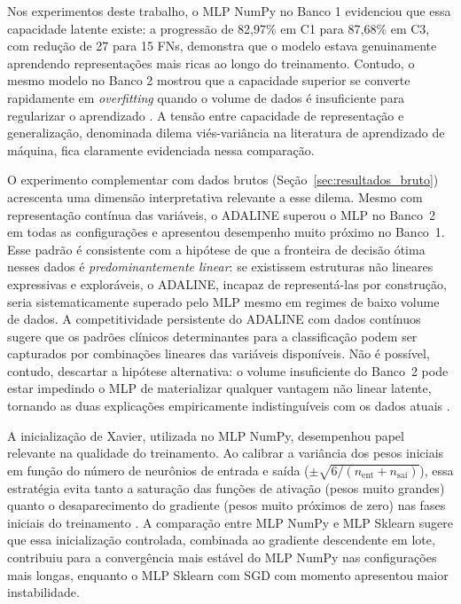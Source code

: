 Nos experimentos deste trabalho, o MLP NumPy no Banco 1 evidenciou que essa capacidade latente existe: a progress\~ao de 82,97\% em C1 para 87,68\% em C3, com redu\c c\~ao de 27 para 15 FNs, demonstra que o modelo estava genuinamente aprendendo representa\c c\~oes mais ricas ao longo do treinamento. Contudo, o mesmo modelo no Banco 2 mostrou que a capacidade superior se converte rapidamente em \textit{overfitting} quando o volume de dados \'e insuficiente para regularizar o aprendizado \cite{silva2016}. A tens\~ao entre capacidade de representa\c c\~ao e generaliza\c c\~ao, denominada dilema vi\'es-vari\^ancia na literatura de aprendizado de m\'aquina, fica claramente evidenciada nessa compara\c c\~ao.

O experimento complementar com dados brutos (Se\c c\~ao~\ref{sec:resultados_bruto}) acrescenta uma dimens\~ao interpretativa relevante a esse dilema. Mesmo com representa\c c\~ao cont\'inua das vari\'aveis, o ADALINE superou o MLP no Banco~2 em todas as configura\c c\~oes e apresentou desempenho muito pr\'oximo no Banco~1. Esse padr\~ao \'e consistente com a hip\'otese de que a fronteira de decis\~ao \'otima nesses dados \'e \textit{predominantemente linear}: se existissem estruturas n\~ao lineares expressivas e explor\'aveis, o ADALINE, incapaz de represent\'a-las por constru\c c\~ao, seria sistematicamente superado pelo MLP mesmo em regimes de baixo volume de dados. A competitividade persistente do ADALINE com dados cont\'inuos sugere que os padr\~oes cl\'inicos determinantes para a classifica\c c\~ao podem ser capturados por combina\c c\~oes lineares das vari\'aveis dispon\'iveis. N\~ao \'e poss\'ivel, contudo, descartar a hip\'otese alternativa: o volume insuficiente do Banco~2 pode estar impedindo o MLP de materializar qualquer vantagem n\~ao linear latente, tornando as duas explica\c c\~oes empiricamente indistingu\'iveis com os dados atuais \cite{silva2016,braga2007}.

A inicializa\c c\~ao de Xavier, utilizada no MLP NumPy, desempenhou papel relevante na qualidade do treinamento. Ao calibrar a vari\^ancia dos pesos iniciais em fun\c c\~ao do n\'umero de neur\^onios de entrada e sa\'ida ($\pm\sqrt{6/(n_{\text{ent}} + n_{\text{saí}})}$), essa estrat\'egia evita tanto a satura\c c\~ao das fun\c c\~oes de ativa\c c\~ao (pesos muito grandes) quanto o desaparecimento do gradiente (pesos muito pr\'oximos de zero) nas fases iniciais do treinamento \cite{braga2007}. A compara\c c\~ao entre MLP NumPy e MLP Sklearn sugere que essa inicializa\c c\~ao controlada, combinada ao gradiente descendente em lote, contribuiu para a converg\^encia mais est\'avel do MLP NumPy nas configura\c c\~oes mais longas, enquanto o MLP Sklearn com SGD com momento apresentou maior instabilidade.

